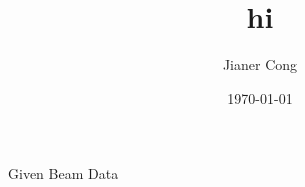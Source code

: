 \documentclass{article}
\title{hi}
\author{Jianer Cong}
\date{\today}
\begin{document}
\begin{center}
  {\Huge Given Beam Data}
\end{center}

\end{document}
